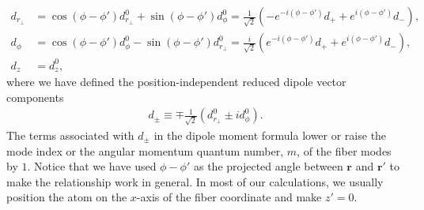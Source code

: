\documentclass[preprint,aps,pra,onecolumn]{revtex4-1} %
\begin{document}
\begin{align}
d_{r\!_\perp}\! &= \cos(\phi\!-\!\phi')d^0_{r\!_\perp}\!\!+\!\sin(\phi\!-\!\phi')d^0_\phi=\frac{1}{\sqrt{2}}\left(-e^{-i(\phi\!-\!\phi')}d_++e^{i(\phi\!-\!\phi')}d_- \right),\\
d_\phi &=\cos(\phi\!-\!\phi')d^0_\phi\!-\!\sin(\phi\!-\!\phi')d^0_{r\!_\perp}=\frac{i}{\sqrt{2}}\left(e^{-i(\phi\!-\!\phi')}d_++e^{i(\phi\!-\!\phi')}d_- \right),\\
d_z &= d^0_z,
\end{align}
where we have defined the position-independent reduced dipole vector components
\begin{align}
d_\pm \equiv \mp \frac{1}{\sqrt{2}}(d^0_{r\!_\perp}\pm id^0_{\phi}).
\end{align}
The terms associated with $d_\pm$ in the dipole moment formula lower or raise the mode index or the angular momentum quantum number, $m$, of the fiber modes by $1$. Notice that we have used $\phi\!-\!\phi'$ as the projected angle between $\mathbf{r}$ and $\mathbf{r}'$ to make the relationship work in general. In most of our calculations, we usually position the atom on the $x$-axis of the fiber coordinate and make $z'=0$.
\end{document}
